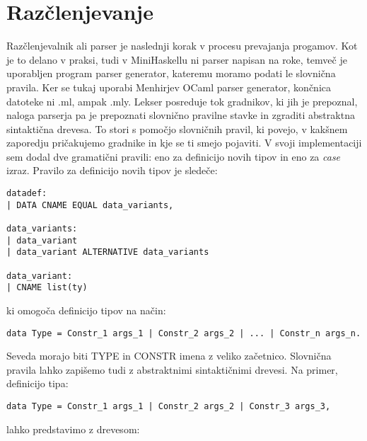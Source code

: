 \documentclass[12pt,a4paper,openany]{book}
\begin{document}
\section{Razčlenjevanje}
Razčlenjevalnik ali parser je naslednji korak v procesu prevajanja progamov. Kot je to delano v praksi, tudi v MiniHaskellu ni parser napisan na roke, temveč 
je uporabljen program parser generator, kateremu moramo podati le slovnična pravila. Ker se tukaj uporabi Menhirjev OCaml parser generator, končnica 
datoteke ni .ml, ampak .mly. Lekser posreduje tok gradnikov, ki jih je prepoznal, naloga parserja pa je prepoznati slovnično pravilne stavke in zgraditi 
abstraktna sintaktična drevesa. To stori s pomočjo slovničnih pravil, ki povejo, v kakšnem zaporedju pričakujemo gradnike in kje se ti smejo pojaviti. 
V svoji implementaciji sem dodal dve gramatični pravili: eno za definicijo novih tipov in eno za \emph{case} izraz. Pravilo za definicijo novih tipov je 
sledeče:
\begin{lstlisting}
datadef:
| DATA CNAME EQUAL data_variants,

data_variants:
| data_variant
| data_variant ALTERNATIVE data_variants

data_variant:
| CNAME list(ty)
\end{lstlisting}
ki omogoča definicijo tipov na način:
\begin{lstlisting}
data Type = Constr_1 args_1 | Constr_2 args_2 | ... | Constr_n args_n.
\end{lstlisting}
Seveda morajo biti TYPE in CONSTR imena z veliko začetnico. Slovnična pravila lahko zapišemo tudi z abstraktnimi sintaktičnimi drevesi. Na primer, 
definicijo tipa:
\begin{lstlisting}
data Type = Constr_1 args_1 | Constr_2 args_2 | Constr_3 args_3,
\end{lstlisting}
lahko predstavimo z drevesom:
\begin{center}
\end{center}
\end{document}
